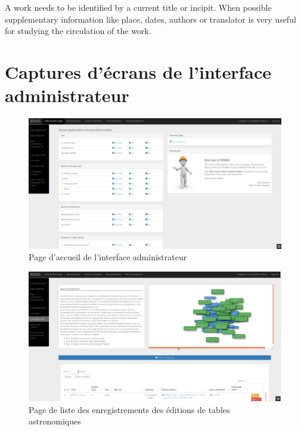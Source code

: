 \documentclass[a4paper,12pt,twoside]{book}
\newcommand{\clearemptydoublepage}{\newpage{\pagestyle{empty}\cleardoublepage}}
\begin{document}
	A work needs to be identified by a current title or incipit. When possible supplementary information like place, dates, authors or translator is very useful for studying the circulation of the work.
	
\clearemptydoublepage

	\chapter{\label{BackOffice}Captures d'écrans de l'interface administrateur}
	\begin{figure}[h!]
		\centering
		\includegraphics[width=17cm]{Annexes/Captures_ecrans/Interface_administrateur/Homepage.png}
		\caption{Page d'accueil de l'interface administrateur}
	\end{figure}

	\begin{figure}[h!]
		\centering
		\includegraphics[width=17cm]{Annexes/Captures_ecrans/Interface_administrateur/List-Edited_texts.png}
		\caption{Page de liste des enregistrements des éditions de tables astronomiques}
	\end{figure}
\end{document}
